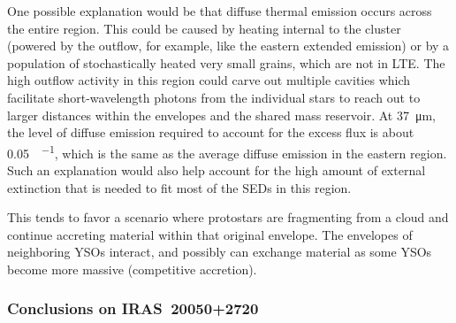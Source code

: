One possible explanation would be that diffuse thermal emission occurs across the entire region. This could be caused by heating internal to the cluster (powered by the outflow, for example, like the eastern extended emission) or by a population of stochastically heated very small grains, which are not in LTE. The high outflow activity in this region could carve out multiple cavities which facilitate short-wavelength photons from the individual stars to reach out to larger distances within the envelopes and the shared mass reservoir. At \SI{37}{\um}, the level of diffuse emission required to account for the excess flux is about \SI{0.05}{\Jy\per\pixel}, which is the same as the average diffuse emission in the eastern region. Such an explanation would also help account for the high amount of external extinction that is needed to fit most of the SEDs in this region.

This tends to favor a scenario where protostars are fragmenting from a cloud and continue accreting material within that original envelope. The envelopes of neighboring YSOs interact, and possibly can exchange material as some YSOs become more massive (competitive accretion). 


\subsubsection{Conclusions on IRAS~20050+2720}

